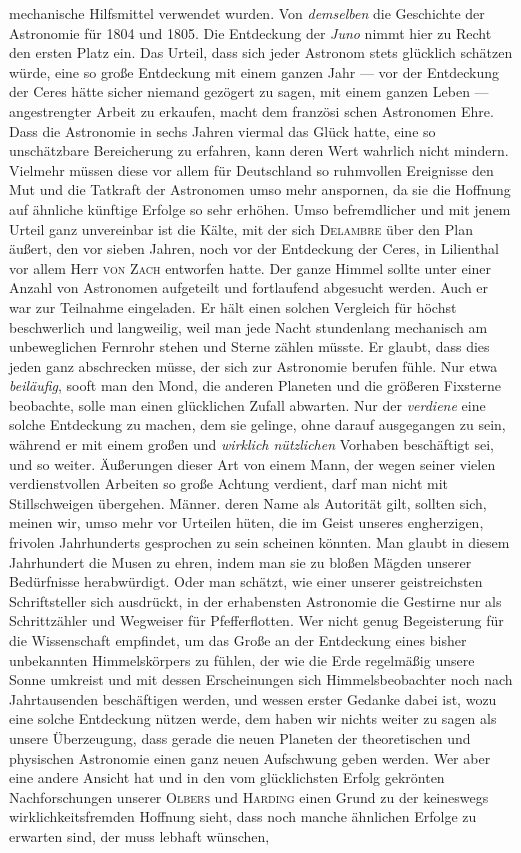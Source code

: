 mechanische Hilfsmittel verwendet wurden. Von \emph{demselben} die Geschichte der Astronomie für 1804 und 1805. Die Entdeckung der \emph{Juno} nimmt hier zu Recht den ersten Platz ein. Das Urteil, dass sich jeder Astronom stets glücklich schätzen würde, eine so große Entdeckung mit einem ganzen Jahr --- vor der Entdeckung der Ceres hätte sicher niemand gezögert zu sagen, mit einem ganzen Leben --- angestrengter Arbeit zu erkaufen, macht dem französi%
%
schen Astronomen Ehre. Dass die Astronomie in sechs Jahren viermal das Glück hatte, eine so unschätzbare Bereicherung zu erfahren, kann deren Wert wahrlich nicht mindern. Vielmehr müssen diese vor allem für Deutschland so ruhmvollen Ereignisse den Mut und die Tatkraft der Astronomen umso mehr anspornen, da sie die Hoffnung auf ähnliche künftige Erfolge so sehr erhöhen. Umso befremdlicher und mit jenem Urteil ganz unvereinbar ist die Kälte, mit der sich \textsc{Delambre} über den Plan äußert, den vor sieben Jahren, noch vor der Entdeckung der Ceres, in Lilienthal vor allem Herr \textsc{von Zach} entworfen hatte. Der ganze Himmel sollte unter einer Anzahl von Astronomen aufgeteilt und fortlaufend abgesucht werden. Auch er war zur Teilnahme eingeladen. Er hält einen solchen Vergleich für höchst beschwerlich und langweilig, weil man jede Nacht stundenlang mechanisch am unbeweglichen Fernrohr stehen und Sterne zählen müsste. Er glaubt, dass dies jeden ganz abschrecken müsse, der sich zur Astronomie berufen fühle. Nur etwa \emph{beiläufig}, sooft man den Mond, die anderen Planeten und die größeren Fixsterne beobachte, solle man einen glücklichen Zufall abwarten. Nur der \emph{verdiene} eine solche Entdeckung zu machen, dem sie gelinge, ohne darauf ausgegangen zu sein, während er mit einem großen und \emph{wirklich nützlichen} Vorhaben beschäftigt sei, und so weiter. Äußerungen dieser Art von einem Mann, der wegen seiner vielen verdienstvollen Arbeiten so große Achtung verdient, darf man nicht mit Stillschweigen übergehen. Männer. deren Name als Autorität gilt, sollten sich, meinen wir, umso mehr vor Urteilen hüten, die im Geist unseres engherzigen, frivolen Jahrhunderts gesprochen zu sein scheinen könnten. Man glaubt in diesem Jahrhundert die Musen zu ehren, indem man sie zu bloßen Mägden unserer Bedürfnisse herabwürdigt. Oder man schätzt, wie einer unserer geistreichsten Schriftsteller sich ausdrückt, in der erhabensten Astronomie die Gestirne nur als Schrittzähler und Wegweiser für Pfefferflotten. Wer nicht genug Begeisterung für die Wissenschaft empfindet, um das Große an der Entdeckung eines bisher unbekannten Himmelskörpers zu fühlen, der wie die Erde regelmäßig unsere Sonne umkreist und mit dessen Erscheinungen sich Himmelsbeobachter noch nach Jahrtausenden beschäftigen werden, und wessen erster Gedanke dabei ist, wozu eine solche Entdeckung nützen werde, dem haben wir nichts weiter zu sagen als unsere Überzeugung, dass gerade die neuen Planeten der theoretischen und physischen Astronomie einen ganz neuen Aufschwung geben werden. Wer aber eine andere Ansicht hat und in den vom glücklichsten Erfolg gekrönten Nachforschungen unserer \textsc{Olbers} und \textsc{Harding} einen Grund zu der keineswegs wirklichkeitsfremden Hoffnung sieht, dass noch manche ähnlichen Erfolge zu erwarten sind, der muss lebhaft wünschen, 